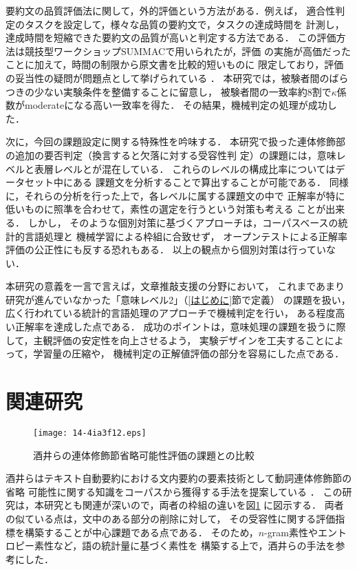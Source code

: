 \documentclass[japanese]{jnlp_1.3e}
\begin{document}
要約文の品質評価法に関して，外的評価という方法がある．例えば，
適合性判定のタスクを設定して，様々な品質の要約文で，タスクの達成時間を
計測し，達成時間を短縮できた要約文の品質が高いと判定する方法である．
この評価方法は競技型ワークショップSUMMACで用いられたが，評価
の実施が高価だったことに加えて，時間の制限から原文書を比較的短いものに
限定しており，評価の妥当性の疑問が問題点として挙げられている
\cite{自動要約}．
本研究では，被験者間のばらつきの少ない実験条件を整備することに留意し，
被験者間の一致率約8割で$\kappa$係数がmoderateになる高い一致率を得た．
その結果，機械判定の処理が成功した．



次に，今回の課題設定に関する特殊性を吟味する．
本研究で扱った連体修飾部の追加の要否判定（換言すると欠落に対する受容性判
定）の課題には，意味レベルと表層レベルとが混在している．
これらのレベルの構成比率についてはデータセット中にある
課題文を分析することで算出することが可能である．
同様に，それらの分析を行った上で，各レベルに属する課題文の中で
正解率が特に低いものに照準を合わせて，素性の選定を行うという対策も考える
ことが出来る．
しかし，
そのような個別対策に基づくアプローチは，コーパスベースの統計的言語処理と
機械学習による枠組に合致せず，
オープンテストによる正解率評価の公正性にも反する恐れもある．
以上の観点から個別対策は行っていない．

本研究の意義を一言で言えば，文章推敲支援の分野において，
これまであまり研究が進んでいなかった「意味レベル2」（\ref{はじめに}節で定義）
の課題を扱い，
広く行われている統計的言語処理のアプローチで機械判定を行い，
ある程度高い正解率を達成した点である．
成功のポイントは，意味処理の課題を扱うに際して，主観評価の安定性を向上させるよう，
実験デザインを工夫することによって，学習量の圧縮や，
機械判定の正解値評価の部分を容易にした点である．


\section{関連研究}

\begin{figure}[b]
    \texttt{[image: 14-4ia3f12.eps]}
  \caption{酒井らの連体修飾節省略可能性評価の課題との比較}
  \label{fig:酒井}
\end{figure}

酒井らはテキスト自動要約における文内要約の要素技術として動詞連体修飾節の省略
可能性に関する知識をコーパスから獲得する手法を提案している
\cite{sakai}\cite{sakai2}．
この研究は，本研究とも関連が深いので，両者の枠組の違いを図\ref{fig:酒井}
に図示する．
両者の似ている点は，文中のある部分の削除に対して，
その受容性に関する評価指標を構築することが中心課題である点である．
そのため，$n$-gram素性やエントロピー素性など，語の統計量に基づく素性を
構築する上で，酒井らの手法を参考にした．
\end{document}
